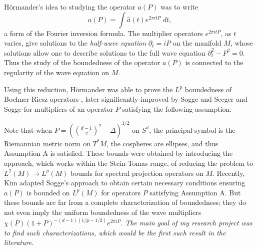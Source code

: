 \documentclass[11pt]{article}
\DeclareMathOperator{\RR}{\mathbb{R}}
\begin{document}
H\"{o}rmander's idea to studying the operator $a(P)$ was to write
%
\[ a(P) = \int \widehat{a}(t) e^{2 \pi i t P}\; dt, \]
%
a form of the Fourier inversion formula. The multiplier operators $e^{2 \pi i t P}$, as $t$ varies, give solutions to the \emph{half-wave equation} $\partial_t = i P$ on the manifold $M$, whose solutions allow one to describe solutions to the full wave equation $\partial_t^2 - P^2 = 0$. Thus the study of the boundedness of the operator $a(P)$ is connected to the regularity of the wave equation on $M$. %

Using this reduction, H\"{o}rmander was able to prove the $L^p$ boundedness of Bochner-Riesz operators \cite{HormanderRiesz}, later significantly improved by Sogge \cites{SoggeSpherical,SoggeRieszMeans} and Seeger and Sogge \cite{SeegerSoggeBochnerRiesz} for multipliers of an operator $P$ satisfying the following assumption:
%
\begin{center}
\fbox{%
    \parbox{\textwidth - 2em}{%
        {\bf Assumption A}: If $p_{\text{prin}}: T^* M \to [0,\infty)$ is the principal symbol of $P$, then for each $x \in M$ the `cosphere' $S_x^* = \{ \xi \in T^*_x M : p_{\text{prin}}(x,\xi) = 1 \}$ has non-vanishing Gaussian curvature.
    }%
}
\end{center}
%
Note that when $P = ( \left( \scriptstyle{ \frac{d-1}{2} } \right)^2 - \Delta )^{1/2}$ on $S^d$, the principal symbol is the Riemannian metric norm on $T^* M$, the cospheres are ellipses, and thus Assumption A is satisfied. These bounds were obtained by introducing the approach, which works within the Stein-Tomas range, of reducing the problem to $L^2(M) \to L^p(M)$ bounds for spectral projection operators on $M$. Recently, Kim \cite{KimManifold} adapted Sogge's approach to obtain certain necessary conditions ensuring $a(P)$ is bounded on $L^p(M)$ for operators $P$ satisfying Assumption A. But these bounds are far from a complete characterization of boundedness; they do not even imply the uniform boundedness of the wave multipliers $\chi(P) (1 + P)^{-(d-1)(1/p - 1/2)} e^{2 \pi i P}$. \emph{The main goal of my research project was to find such characterizations, which would be the first such result in the literature}.

\end{document}
